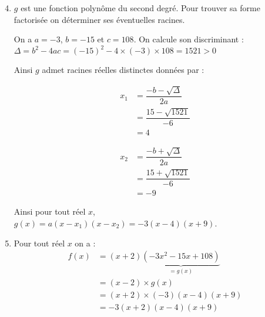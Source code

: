 \documentclass[15pt, mathserif]{beamer}
\begin{document}
 \begin{frame} 
 \begin{enumerate} 
 \setcounter{enumi}{3} 
 	\item $g$ est une fonction polynôme du second degré. Pour trouver sa forme factorisée on déterminer ses éventuelles racines.
 
 On a $a=-3$, $b=-15$ et $c=108$. On calcule son discriminant : \hfil $\Delta=b^2-4ac= \left(-15\right)^2 -4 \times \left(-3\right) \times 108= 1521 >0$ 
 
 Ainsi $g$ admet racines réelles distinctes données par : \begin{minipage}{0.45\linewidth} 
 \begin{align*} 
 x_1 &= \dfrac{-b-\sqrt{\Delta}}{2a} \\ 
 &= \dfrac{15-\sqrt{1521}}{-6} \\ 
 &= 4\end{align*} 
 \end{minipage} 
 \hfil \begin{minipage}{0.45\linewidth} 
 \begin{align*}x_2 &= \dfrac{-b+\sqrt{\Delta}}{2a} \\ 
 &= \dfrac{15+\sqrt{1521}}{-6} \\ 
 &= -9
 \end{align*} 
 \end{minipage} 
 
 Ainsi pour tout réel $x$, $g(x)=a(x-x_1)(x-x_2)= -3\left(x-4\right)\left(x+9 \right)$. 
 \end{enumerate}
 \end{frame} 
 \begin{frame} 
 \begin{enumerate} 
 \setcounter{enumi}{4} 
 	 \item Pour tout réel $x$ on a :
 \begin{align*} 
 f(x)&=(x+2)\underbrace{(-3x^2-15x+108)}_{=g(x)} \\ 
   &= (x-2) \times g(x) \\ 
  &= (x+2) \times \left(-3\right)\left(x-4\right)\left(x+9 \right) \\ 
 &= -3(x+2)\left(x-4\right)\left(x+9 \right)
   \end{align*}
 \end{enumerate} 
 
 \end{frame}
\end{document}
